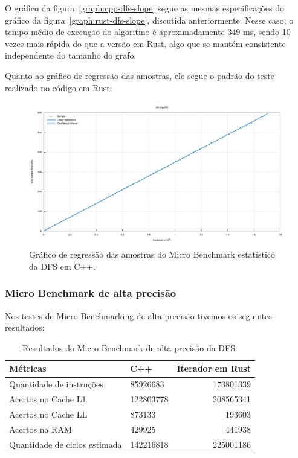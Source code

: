 O gráfico da figura~\ref{graph:cpp-dfs-slope} segue as mesmas
especificações do gráfico da figura~\ref{graph:rust-dfs-slope},
discutida anteriormente. Nesse caso, o tempo médio de execução do
algoritmo é aproximadamente 349 ms, sendo 10 vezes mais rápida do que
a versão em Rust, algo que se mantém consistente independente do
tamanho do grafo.

Quanto ao gráfico de regressão das amostras, ele segue o padrão do
teste realizado no código em Rust:

\begin{figure}[!ht]
  \centering
  \caption{Gráfico de regressão das amostras do Micro Benchmark
  estatístico da DFS em C++.}
  \includegraphics[width=\textwidth]{figures/cpp-dfs-500-regression.pdf}
\end{figure}
\FloatBarrier

\subsubsection{Micro Benchmark de alta precisão}

Nos testes de Micro Benchmarking de alta precisão tivemos os
seguintes resultados:

\begin{table}[!ht]
  \centering
  \caption{Resultados do Micro Benchmark de alta precisão da DFS.}
  \begin{tabular}{llr}
    \toprule
    Métricas                 &  C++    & Iterador em Rust \\
    \midrule
    Quantidade de instruções      & 85926683  & 173801339 \\
    Acertos no Cache L1           & 122803778 & 208565341 \\
    Acertos no Cache LL           & 873133    & 193603    \\
    Acertos na RAM                & 429925    & 441938    \\
    Quantidade de ciclos estimada & 142216818 & 225001186 \\
    \bottomrule
  \end{tabular}
  \label{tab:microhp-dfs}
\end{table}
\FloatBarrier

